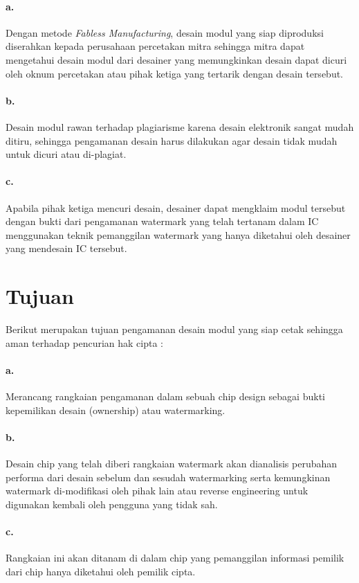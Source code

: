\paragraph{a.} Dengan metode \textit{Fabless Manufacturing}, desain modul yang siap diproduksi diserahkan kepada perusahaan percetakan mitra sehingga mitra dapat mengetahui desain modul dari desainer yang memungkinkan desain dapat dicuri oleh oknum percetakan atau pihak ketiga yang tertarik dengan desain tersebut.
\paragraph{b.}Desain modul rawan terhadap plagiarisme karena desain elektronik sangat mudah ditiru, sehingga pengamanan desain harus dilakukan agar desain tidak mudah untuk dicuri atau di-plagiat.
\paragraph{c.}Apabila pihak ketiga mencuri desain, desainer dapat mengklaim modul tersebut dengan bukti dari pengamanan watermark yang telah tertanam dalam IC menggunakan teknik pemanggilan watermark yang hanya diketahui oleh desainer yang mendesain IC tersebut.

\section{Tujuan}
Berikut merupakan tujuan pengamanan desain modul yang siap cetak sehingga aman terhadap pencurian hak cipta :
\paragraph{a.} Merancang rangkaian pengamanan dalam sebuah chip design sebagai bukti kepemilikan desain (ownership) atau watermarking.
\paragraph{b.} Desain chip yang telah diberi rangkaian watermark akan dianalisis perubahan performa dari desain sebelum dan sesudah watermarking serta kemungkinan watermark di-modifikasi oleh pihak lain atau reverse engineering untuk digunakan kembali oleh pengguna yang tidak sah.
\paragraph{c.} Rangkaian ini akan ditanam di dalam chip yang pemanggilan informasi pemilik dari chip hanya diketahui oleh pemilik cipta.

